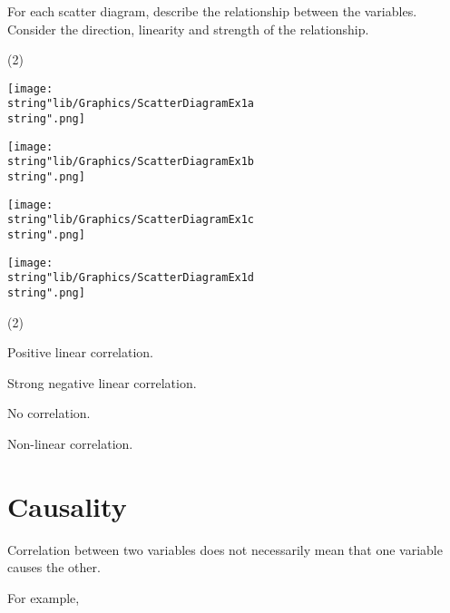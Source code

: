 \documentclass[11pt,a4paper]{book}
\begin{document}
\begin{example}

For each scatter diagram, describe the relationship between the variables.
Consider the direction, linearity and strength of the relationship.

\begin{tasks}[label=(\alph*),label-width=3.5ex](2)

\task \texttt{[image: \\string"lib/Graphics/ScatterDiagramEx1a\\string".png]}

\task \texttt{[image: \\string"lib/Graphics/ScatterDiagramEx1b\\string".png]}

\task \texttt{[image: \\string"lib/Graphics/ScatterDiagramEx1c\\string".png]}

\task \texttt{[image: \\string"lib/Graphics/ScatterDiagramEx1d\\string".png]}

\end{tasks}

\Solution

\begin{tasks}[label=(\alph*),label-width=3.5ex](2)

\task  Positive linear correlation.

\task  Strong negative linear correlation.

\task  No correlation.

\task  Non-linear correlation.

\end{tasks}
\end{example}

\newpage

\section{Causality}

Correlation between two variables does not necessarily mean that one
variable causes the other.

For example,
\end{document}
